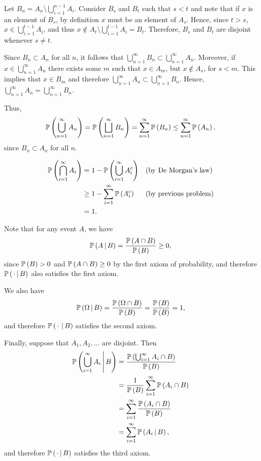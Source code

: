 \begin{ex}
  Let $B_n=A_n\setminus \bigcup_{i=1}^{n-1}A_i$. Consider $B_s$ and $B_t$ such
  that $s<t$ and note that if $x$ is an element of $B_s$, by definition $x$ must
  be an element of $A_s$. Hence, since $t>s$,
  $x\in\bigcup_{i=1}^{t-1} A_i$, and thus
  $x\not\in A_t\setminus \bigcup_{i=1}^{t-1}A_i=B_t$. Therefore, $B_s$ and $B_t$
  are disjoint whenever $s\neq t$.

  Since $B_n\subset A_n$ for all $n$, it follows that
  $\bigcup_{n=1}^\infty B_n\subset \bigcup_{n=1}^\infty A_n$. Moreover, if
  $x\in \bigcup_{n=1}^\infty A_n$ there exists some $m$ such that $x\in A_m$,
  but $x\not\in A_s$, for $s<m$. This implies that $x\in B_m$ and therefore
  $\bigcup_{n=1}^\infty A_n\subset \bigcup_{n=1}^\infty B_n$. Hence,
  $\bigcup_{n=1}^\infty A_n= \bigcup_{n=1}^\infty B_n$.

  Thus,
  \[
    \P{\bigcup_{n=1}^\infty A_n}
    =\P{\bigsqcup_{n=1}^\infty B_n}
    =\sum_{n=1}^\infty \P{B_n}
    \leq \sum_{n=1}^\infty \P{A_n},
  \]
  since $B_n\subset A_n$ for all $n$.
\end{ex}

\begin{ex}
  \begin{align*}
    \P{\bigcap_{i=1}^\infty A_i}
     & =1-\P{\bigcup_{i=1}^\infty A_i^c} &  & \text{(by De Morgan's law)}  \\
     & \geq 1-\sum_{i=1}^\infty\P{A_i^c} &  & \text{(by previous problem)} \\
     & =1.
  \end{align*}
\end{ex}

\begin{ex}
  Note that for any event $A$, we have
  \[
    \cP{A}{B}
    =\frac{\P{A\cap B}}{\P{B}}\geq 0,
  \]
  since $\P{B}> 0$ and $\P{A\cap B}\geq 0$ by the first axiom of probability,
  and therefore $\cP{\,\cdot}{B}$ also satisfies the first axiom.

  We also have
  \[
    \cP{\Omega}{B}=\frac{\P{\Omega\cap B}}{\P{B}}=\frac{\P{B}}{\P{B}}=1,
  \]
  and therefore $\cP{\,\cdot\,}{B}$ satisfies the second axiom.

  Finally, suppose that $A_1, A_2, \ldots$ are disjoint. Then
  \begin{align*}
    \cP{\bigcup_{i=1}^\infty A_i}{B}
     & =\frac{\P{\bigcup_{i=1}^\infty A_i\cap B}}{\P{B}} \\
     & =\frac{1}{\P{B}}\sum_{i=1}^\infty \P{A_i \cap B}  \\
     & =\sum_{i=1}^\infty \frac{\P{A_i \cap B}}{\P{B}}   \\
     & =\sum_{i=1}^\infty \cP{A_i}{B},
  \end{align*}
  and therefore $\cP{\,\cdot}{B}$ satisfies the third axiom.
\end{ex}

